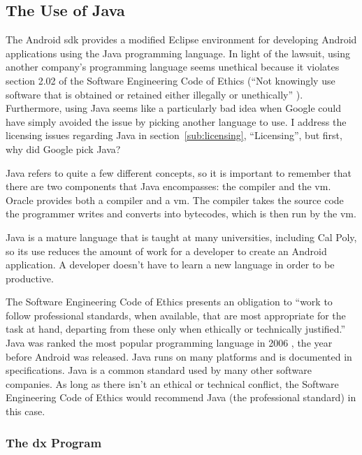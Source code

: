 \documentclass[11pt]{article}
\begin{document}
\begin{multicols}{2}

\subsection{The Use of Java} %
\label{sub:java}

The Android \gls{sdk} provides a modified Eclipse environment for developing
Android applications using the Java programming language.  In light of the
lawsuit, using another company's programming language seems unethical because it
violates section 2.02 of the Software Engineering Code of Ethics (``Not
knowingly use software that is obtained or retained either illegally or
unethically'' \cite[\S 2.02]{secode}).  Furthermore, using Java seems like a
particularly bad idea when Google could have simply avoided the issue by picking
another language to use.  I address the licensing issues regarding Java in
section~\ref{sub:licensing}, ``Licensing'', but first, why did Google pick Java?

Java refers to quite a few different concepts, so it is important to remember
that there are two components that Java encompasses: the compiler and the
\gls{vm}.  Oracle provides both a compiler and a \gls{vm}.  The compiler takes
the source code the programmer writes and converts into \glspl{bytecode}, which
is then run by the \gls{vm}.

Java is a mature language that is taught at many universities, including Cal
Poly, so its use reduces the amount of work for a developer to create an Android
application.  A developer doesn't have to learn a new language in order to be
productive.

The Software Engineering Code of Ethics presents an obligation to
``work to follow professional standards, when available, that are most
appropriate for the task at hand, departing from these only when ethically or
technically justified.'' \cite[\S 3.06]{secode}  Java was ranked the most
popular programming language in 2006 \cite[Long term trends]{tiobe}, the year
before Android was released.  Java runs on many platforms and is documented in
specifications.  Java is a common standard used by many other software
companies.  As long as there isn't an ethical or technical conflict, the
Software Engineering Code of Ethics would recommend Java (the professional
standard) in this case.

\subsubsection{The dx Program} %
\label{ssub:dex}


\end{multicols}
\end{document}
